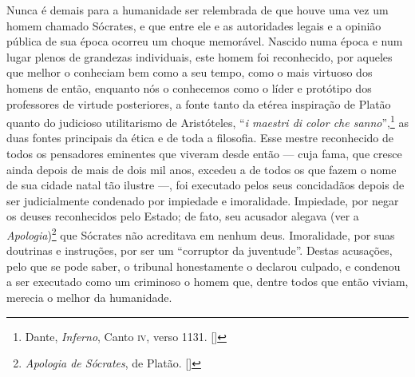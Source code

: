 Nunca é demais para a humanidade ser relembrada de que houve uma vez um
homem chamado Sócrates, e que entre ele e as autoridades legais e a
opinião pública de sua época ocorreu um choque memorável. Nascido numa
época e num lugar plenos de grandezas individuais, este homem foi
reconhecido, por aqueles que melhor o conheciam bem como a seu tempo,
como o mais virtuoso dos homens de então, enquanto nós o conhecemos
como o líder e protótipo dos professores de virtude posteriores, a
fonte tanto da etérea inspiração de Platão quanto do judicioso
utilitarismo de Aristóteles, ``\textit{i maestri di color che sanno}'',\footnote{ Dante, \textit{Inferno}, 
Canto \textsc{iv}, verso 1131. []} as duas fontes
principais da ética e de toda a filosofia. Esse mestre reconhecido de
todos os pensadores eminentes que viveram desde então --- cuja fama, que
cresce ainda depois de mais de dois mil anos, excedeu a de todos os que
fazem o nome de sua cidade natal tão ilustre ---, foi executado pelos
seus concidadãos depois de ser judicialmente condenado por impiedade e
imoralidade. Impiedade, por negar os deuses reconhecidos pelo Estado;
de fato, seu acusador alegava (ver a \textit{Apologia})\footnote{ \textit{Apologia 
de Sócrates}, de Platão. []}  que Sócrates
não acreditava em nenhum deus. Imoralidade, por suas doutrinas e
instruções, por ser um ``corruptor da juventude''. Destas acusações, 
pelo que se pode saber, o tribunal honestamente o declarou culpado, e
condenou a ser executado como um criminoso o homem que, dentre todos que
então viviam, merecia o melhor da humanidade. 

